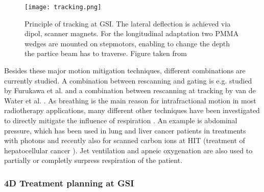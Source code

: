 \documentclass[type=dr, dr=rernat, accentcolor=tud7b,colorbacktitle, bigchapter, openright, twoside, 12pt ]{tudthesis}
\begin{document}
\begin{figure}[H]
\begin{center}
\texttt{[image: tracking.png]}
\caption{Principle of tracking at GSI. The lateral deflection is achieved via dipol, scanner magnets. For the longitudinal adaptation two 
PMMA wedges are mounted on stepmotors, enabling to change the depth the partice beam has to traverse. Figure taken from \cite{Gro04}}
\label{tracking}
\end{center}
\end{figure}

Besides these major motion mitigation techniques, different combinations are currently studied. A combination between rescanning and 
gating is e.g. studied by Furukawa et al. \cite{Fur07} and a combination between rescanning at tracking by van de Water et al. \cite{Wat09}.\newline
\newline
As breathing is the main reason for intrafractional motion in most radiotherapy applications, many different other techniques have been 
investigated to directly mitigate the influence of respiration \cite{Lue12}. An example is abdominal pressure, which has been used in lung 
and liver cancer patients in treatments with photons \cite{Neg01} \cite{Hof03} and recently also for scanned carbon ions at HIT (treatment 
of hepatocellular cancer \cite{Ric12}). Jet ventilation \cite{Hof03} and apneic oxygenation \cite{RPTC12} are also used to partially or 
completly surpress respiration of the patient. 


\subsubsection{4D Treatment planning at GSI}
\end{document}
